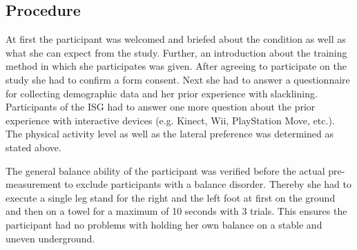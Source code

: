 \subsection{Procedure}
At first the participant was welcomed and briefed about the condition as well as what she can expect from the study.
Further, an introduction about the training method in which she participates was given.
After agreeing to participate on the study she had to confirm a form consent.
Next she had to answer a questionnaire for collecting demographic data and her prior experience with slacklining.
Participants of the ISG had to answer one more question about the prior experience with interactive devices (e.g. Kinect, Wii, PlayStation Move, etc.).
The physical activity level as well as the lateral preference was determined as stated above.

The general balance ability of the participant was verified before the actual pre-measurement to exclude participants with a balance disorder.
Thereby she had to execute a single leg stand for the right and the left foot at first on the ground and then on a towel for a maximum of 10 seconds with 3 trials.
This ensures the participant had no problems with holding her own balance on a stable and uneven underground.

